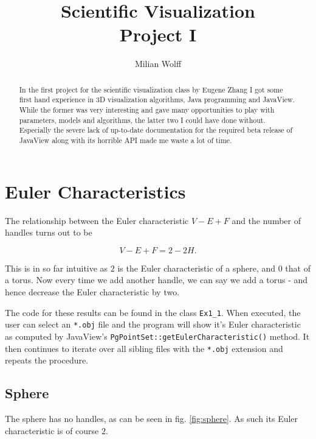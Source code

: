 \documentclass[a4paper,10pt,notitlepage]{scrreprt}
\title{Scientific Visualization\\Project I}
\author{Milian Wolff}
\begin{document}
\maketitle

\begin{abstract}
In the first project for the scientific visualization class by Eugene Zhang I
got some first hand experience in 3D visualization algorithms, Java programming
and JavaView. While the former was very interesting and gave many opportunities
to play with parameters, models and algorithms, the latter two I could have
done without. Especially the severe lack of up-to-date documentation for the
required beta release of JavaView along with its horrible API made me waste a
lot of time.
\end{abstract}

\begingroup
\let\clearpage\relax

\tableofcontents
\endgroup

\chapter{Euler Characteristics}

The relationship between the Euler characteristic $V-E+F$ and the number of
handles turns out to be

\begin{equation}
 V-E+F = 2-2H .
 \label{eq:handle-euler}
\end{equation}

This is in so far intuitive as $2$ is the Euler characteristic of a sphere, and
$0$ that of a torus. Now every time we add another handle, we can say we add a
torus - and hence decrease the Euler characteristic by two.

The code for these results can be found in the class \texttt{Ex1\_1}. When
executed, the user can select an \texttt{*.obj} file and the program will
show it's Euler characteristic as computed by JavaView's
\texttt{PgPointSet::getEulerCharacteristic()} method. It then continues to
iterate over all sibling files with the \texttt{*.obj} extension and repeats the
procedure.

\section{Sphere}

The sphere has no handles, as can be seen in fig. \ref{fig:sphere}. As such its
Euler characteristic is of course $2$.
\end{document}

